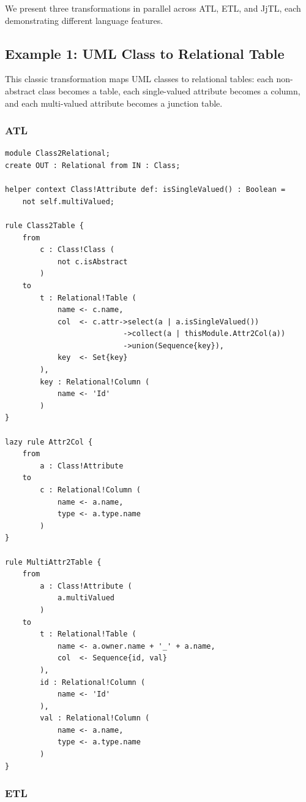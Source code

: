 \documentclass[11pt,a4paper]{article}
\newcommand{\jjtl}{\textsf{JjTL}}
\begin{document}
We present three transformations in parallel across ATL, ETL, and \jjtl{}, each demonstrating different language features.


\subsection{Example 1: UML Class to Relational Table}

This classic transformation maps UML classes to relational tables: each non-abstract class becomes a table, each single-valued attribute becomes a column, and each multi-valued attribute becomes a junction table.

\subsubsection{ATL}

\begin{lstlisting}[style=atl,caption={Class2Relational in ATL}]
module Class2Relational;
create OUT : Relational from IN : Class;

helper context Class!Attribute def: isSingleValued() : Boolean =
    not self.multiValued;

rule Class2Table {
    from
        c : Class!Class (
            not c.isAbstract
        )
    to
        t : Relational!Table (
            name <- c.name,
            col  <- c.attr->select(a | a.isSingleValued())
                           ->collect(a | thisModule.Attr2Col(a))
                           ->union(Sequence{key}),
            key  <- Set{key}
        ),
        key : Relational!Column (
            name <- 'Id'
        )
}

lazy rule Attr2Col {
    from
        a : Class!Attribute
    to
        c : Relational!Column (
            name <- a.name,
            type <- a.type.name
        )
}

rule MultiAttr2Table {
    from
        a : Class!Attribute (
            a.multiValued
        )
    to
        t : Relational!Table (
            name <- a.owner.name + '_' + a.name,
            col  <- Sequence{id, val}
        ),
        id : Relational!Column (
            name <- 'Id'
        ),
        val : Relational!Column (
            name <- a.name,
            type <- a.type.name
        )
}
\end{lstlisting}

\subsubsection{ETL}
\end{document}
